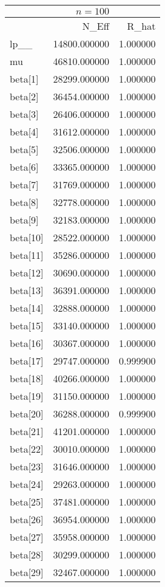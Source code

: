 \begin{tabular}{lrr}
& $ n = 100 $ & \\
\toprule
 & N\_Eff & R\_hat \\
\midrule
lp\_\_ & 14800.000000 & 1.000000 \\
mu & 46810.000000 & 1.000000 \\
beta[1] & 28299.000000 & 1.000000 \\
beta[2] & 36454.000000 & 1.000000 \\
beta[3] & 26406.000000 & 1.000000 \\
beta[4] & 31612.000000 & 1.000000 \\
beta[5] & 32506.000000 & 1.000000 \\
beta[6] & 33365.000000 & 1.000000 \\
beta[7] & 31769.000000 & 1.000000 \\
beta[8] & 32778.000000 & 1.000000 \\
beta[9] & 32183.000000 & 1.000000 \\
beta[10] & 28522.000000 & 1.000000 \\
beta[11] & 35286.000000 & 1.000000 \\
beta[12] & 30690.000000 & 1.000000 \\
beta[13] & 36391.000000 & 1.000000 \\
beta[14] & 32888.000000 & 1.000000 \\
beta[15] & 33140.000000 & 1.000000 \\
beta[16] & 30367.000000 & 1.000000 \\
beta[17] & 29747.000000 & 0.999900 \\
beta[18] & 40266.000000 & 1.000000 \\
beta[19] & 31150.000000 & 1.000000 \\
beta[20] & 36288.000000 & 0.999900 \\
beta[21] & 41201.000000 & 1.000000 \\
beta[22] & 30010.000000 & 1.000000 \\
beta[23] & 31646.000000 & 1.000000 \\
beta[24] & 29263.000000 & 1.000000 \\
beta[25] & 37481.000000 & 1.000000 \\
beta[26] & 36954.000000 & 1.000000 \\
beta[27] & 35958.000000 & 1.000000 \\
beta[28] & 30299.000000 & 1.000000 \\
beta[29] & 32467.000000 & 1.000000 \\

\end{tabular}
